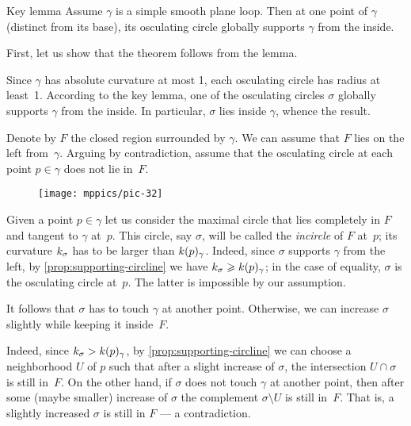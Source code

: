 \begin{thm}{Key lemma}\label{thm:moon}
Assume $\gamma$ is a simple smooth plane loop.
Then at one point of $\gamma$ (distinct from its base), its osculating circle globally supports $\gamma$ from the inside.
\end{thm}

First, let us show that the theorem follows from the lemma.

Since $\gamma$ has absolute curvature at most 1, each osculating circle has radius at least~1.
According to the key lemma, one of the osculating circles $\sigma$ globally supports $\gamma$ from the inside.
In particular, $\sigma$ lies inside $\gamma$, whence the result.
\qeds

Denote by $F$ the closed region surrounded by $\gamma$.
We can assume that $F$ lies on the left from~$\gamma$.
Arguing by contradiction,
assume that the osculating circle at each point $p\in \gamma$ does not lie in~$F$.

\begin{figure}[!ht]
\vskip-0mm
\centering
\texttt{[image: mppics/pic-32]}
\vskip-2mm
\end{figure}

Given a point $p\in\gamma$ let us consider the maximal circle that lies completely in $F$ and tangent to $\gamma$ at~$p$.
This circle, say $\sigma$, will be called the {}\emph{incircle} of $F$ at~$p$;
its curvature $k_\sigma$ has to be larger than $k(p)_\gamma$.
Indeed, since $\sigma$ supports $\gamma$ from the left, by \ref{prop:supporting-circline} we have $k_\sigma\geqslant k(p)_\gamma$; in the case of equality, $\sigma$ is the osculating circle at~$p$.
The latter is impossible by our assumption.

It follows that $\sigma$ has to touch $\gamma$ at another point.
Otherwise, we can increase $\sigma$ slightly while keeping it inside~$F$.

Indeed, since $k_\sigma> k(p)_\gamma$, 
by \ref{prop:supporting-circline} we can choose a neighborhood $U$ of $p$ such that after a slight increase of $\sigma$, the intersection $U\cap \sigma$ is still in~$F$.
On the other hand, if $\sigma$ does not touch $\gamma$ at another point, then after some (maybe smaller) increase of $\sigma$ the complement $\sigma\setminus U$ is still in~$F$.
That is, a slightly increased $\sigma$ is still in $F$ --- a contradiction.



